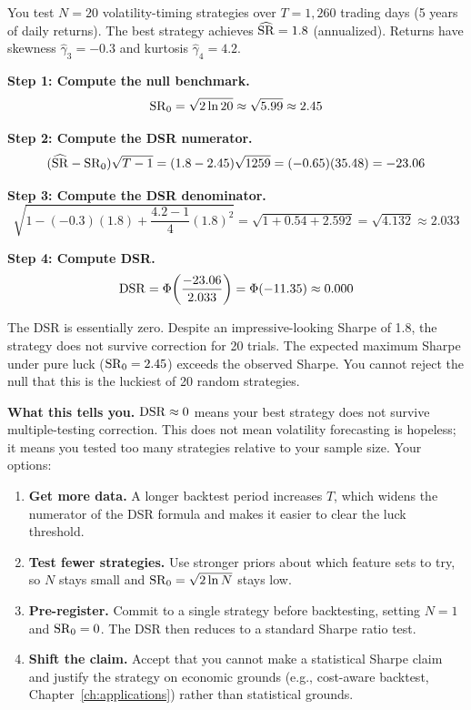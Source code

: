 \begin{workedexample}
You test $N = 20$ volatility-timing strategies over $T = 1{,}260$ trading days (5 years of daily returns).
The best strategy achieves $\widehat{\operatorname{SR}} = 1.8$ (annualized).
Returns have skewness $\hat{\gamma}_3 = -0.3$ and kurtosis $\hat{\gamma}_4 = 4.2$.

\textbf{Step 1: Compute the null benchmark.}
\[
\operatorname{SR}_0 = \sqrt{2 \ln 20} \approx \sqrt{5.99} \approx 2.45
\]

\textbf{Step 2: Compute the DSR numerator.}
\[
(\widehat{\operatorname{SR}} - \operatorname{SR}_0)\sqrt{T - 1} = (1.8 - 2.45)\sqrt{1259} = (-0.65)(35.48) = -23.06
\]

\textbf{Step 3: Compute the DSR denominator.}
\[
\sqrt{1 - (-0.3)(1.8) + \frac{4.2 - 1}{4}(1.8)^2} = \sqrt{1 + 0.54 + 2.592} = \sqrt{4.132} \approx 2.033
\]

\textbf{Step 4: Compute DSR.}
\[
\operatorname{DSR} = \Phi\!\left(\frac{-23.06}{2.033}\right) = \Phi(-11.35) \approx 0.000
\]

The DSR is essentially zero.
Despite an impressive-looking Sharpe of 1.8, the strategy does not survive correction for 20 trials.
The expected maximum Sharpe under pure luck ($\operatorname{SR}_0 = 2.45$) exceeds the observed Sharpe.
You cannot reject the null that this is the luckiest of 20 random strategies.

\textbf{What this tells you.}
$\operatorname{DSR} \approx 0$ means your best strategy does not survive multiple-testing correction.
This does not mean volatility forecasting is hopeless; it means you tested too many strategies relative to your sample size.
Your options:
\begin{enumerate}[nosep]
  \item \textbf{Get more data.} A longer backtest period increases $T$, which widens the numerator of the DSR formula and makes it easier to clear the luck threshold.
  \item \textbf{Test fewer strategies.} Use stronger priors about which feature sets to try, so $N$ stays small and $\operatorname{SR}_0 = \sqrt{2 \ln N}$ stays low.
  \item \textbf{Pre-register.} Commit to a single strategy before backtesting, setting $N = 1$ and $\operatorname{SR}_0 = 0$. The DSR then reduces to a standard Sharpe ratio test.
  \item \textbf{Shift the claim.} Accept that you cannot make a statistical Sharpe claim and justify the strategy on economic grounds (e.g., cost-aware backtest, Chapter~\ref{ch:applications}) rather than statistical grounds.
\end{enumerate}
\end{workedexample}


